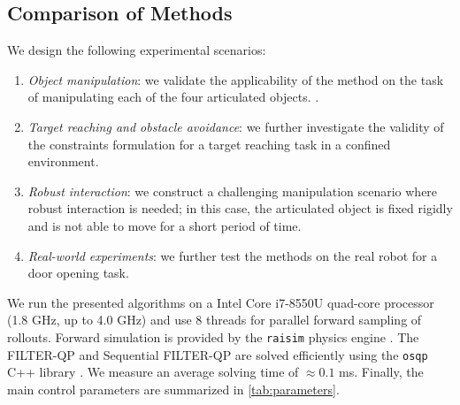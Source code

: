 

\subsection{Comparison of Methods}
We design the following experimental scenarios:
\begin{enumerate}
    \item \textit{Object manipulation}: we validate the applicability of the method on the task of manipulating each of the four articulated objects. . 
    \item \textit{Target reaching and obstacle avoidance}: we further investigate the validity of the constraints formulation for a target reaching task in a confined environment.  
    \item \textit{Robust interaction}: we construct a challenging manipulation scenario where robust interaction is needed; in this case, the articulated object is fixed rigidly and is not able to move for a short period of time.
    \item \textit{Real-world experiments}: we further test the methods on the real robot for a door opening task. 
\end{enumerate}

We run the presented algorithms on a Intel Core i7-8550U quad-core processor (1.8 GHz, up to 4.0 GHz) and use 8 threads for parallel forward sampling of rollouts. Forward simulation is provided by the \texttt{raisim} physics engine \cite{raisim}. The FILTER-QP and Sequential FILTER-QP are solved efficiently using the \texttt{osqp} C++ library \cite{osqp}. We measure an average solving time of $\approx 0.1$ ms. Finally, the main control parameters are summarized in \tab \ref{tab:parameters}.  


